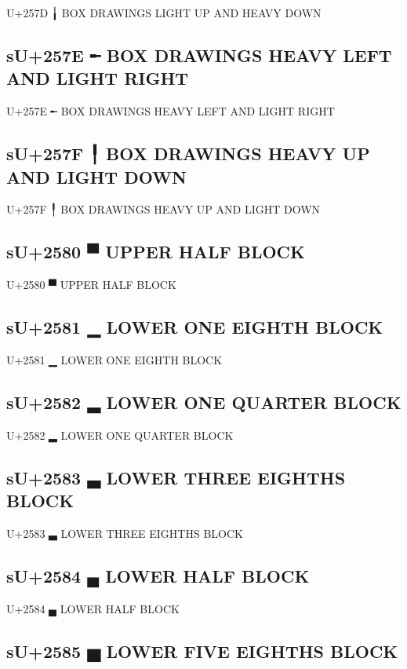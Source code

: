 U+257D ╽ BOX DRAWINGS LIGHT UP AND HEAVY DOWN

\subsection{sU+257E ╾ BOX DRAWINGS HEAVY LEFT AND LIGHT RIGHT}

U+257E ╾ BOX DRAWINGS HEAVY LEFT AND LIGHT RIGHT

\subsection{sU+257F ╿ BOX DRAWINGS HEAVY UP AND LIGHT DOWN}

U+257F ╿ BOX DRAWINGS HEAVY UP AND LIGHT DOWN

\subsection{sU+2580 ▀ UPPER HALF BLOCK}

U+2580 ▀ UPPER HALF BLOCK

\subsection{sU+2581 ▁ LOWER ONE EIGHTH BLOCK}

U+2581 ▁ LOWER ONE EIGHTH BLOCK

\subsection{sU+2582 ▂ LOWER ONE QUARTER BLOCK}

U+2582 ▂ LOWER ONE QUARTER BLOCK

\subsection{sU+2583 ▃ LOWER THREE EIGHTHS BLOCK}

U+2583 ▃ LOWER THREE EIGHTHS BLOCK

\subsection{sU+2584 ▄ LOWER HALF BLOCK}

U+2584 ▄ LOWER HALF BLOCK

\subsection{sU+2585 ▅ LOWER FIVE EIGHTHS BLOCK}

